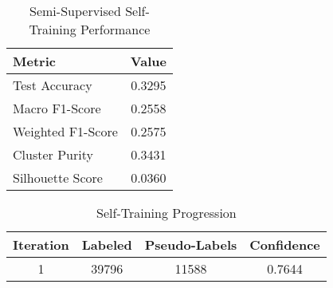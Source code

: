 \begin{table}[h]
\centering
\caption{Semi-Supervised Self-Training Performance}
\label{tab:performance}
\begin{tabular}{lc}
\hline
\textbf{Metric} & \textbf{Value} \\
\hline
Test Accuracy & 0.3295 \\
Macro F1-Score & 0.2558 \\
Weighted F1-Score & 0.2575 \\
Cluster Purity & 0.3431 \\
Silhouette Score & 0.0360 \\
\hline
\end{tabular}
\end{table}

\begin{table}[h]
\centering
\caption{Self-Training Progression}
\label{tab:progression}
\begin{tabular}{cccc}
\hline
\textbf{Iteration} & \textbf{Labeled} & \textbf{Pseudo-Labels} & \textbf{Confidence} \\
\hline
1 & 39796 & 11588 & 0.7644 \\
\hline
\end{tabular}
\end{table}